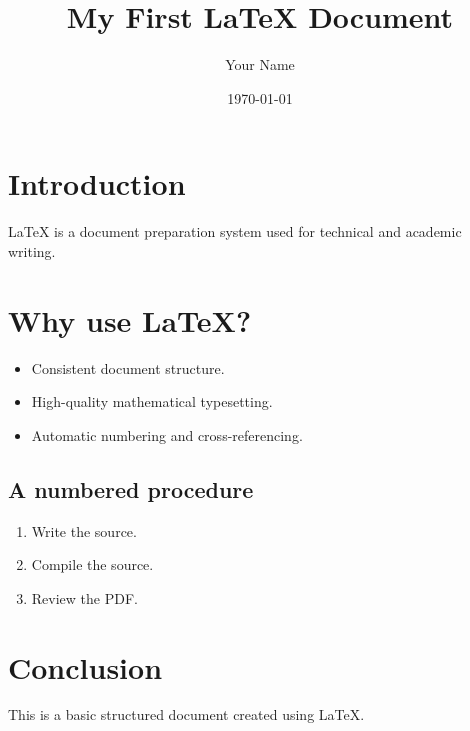 \documentclass[12pt,a4paper]{article}
\title{My First LaTeX Document}
\author{Your Name}
\date{\today}
\begin{document}
\maketitle
\tableofcontents
\newpage

\section{Introduction}
LaTeX is a document preparation system used for technical and academic writing.

\section{Why use LaTeX?}
\begin{itemize}
  \item Consistent document structure.
  \item High-quality mathematical typesetting.
  \item Automatic numbering and cross-referencing.
\end{itemize}

\subsection{A numbered procedure}
\begin{enumerate}
  \item Write the source.
  \item Compile the source.
  \item Review the PDF.
\end{enumerate}

\section{Conclusion}
This is a basic structured document created using LaTeX.
\end{document}
